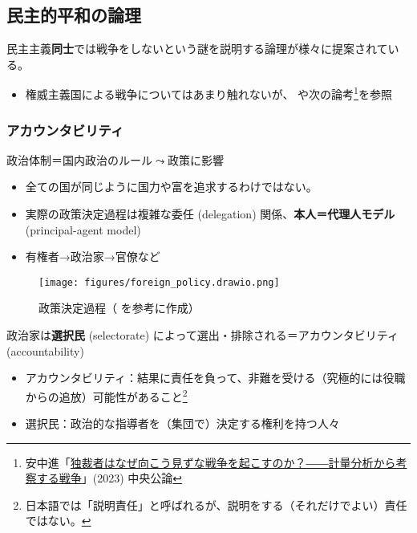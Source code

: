 \documentclass[
  xelatex,
  ja=standard]{bxjsarticle}
\providecommand{\tightlist}{%
  \setlength{\itemsep}{0pt}\setlength{\parskip}{0pt}}\usepackage{longtable,booktabs,array}
\begin{document}
\hypertarget{ux6c11ux4e3bux7684ux5e73ux548cux306eux8ad6ux7406}{%
\subsection{民主的平和の論理}\label{ux6c11ux4e3bux7684ux5e73ux548cux306eux8ad6ux7406}}

民主主義\textbf{同士}では戦争をしないという謎を説明する論理が様々に提案されている。

\begin{itemize}
\tightlist
\item
  権威主義国による戦争についてはあまり触れないが、 \citet{weeks2012}
  や次の論考\footnote{安中進「\href{https://chuokoron.jp/international/122696.html}{独裁者はなぜ向こう見ずな戦争を起こすのか？――計量分析から考察する戦争}」(2023)
    中央公論}を参照
\end{itemize}

\hypertarget{ux30a2ux30abux30a6ux30f3ux30bfux30d3ux30eaux30c6ux30a3}{%
\subsubsection{アカウンタビリティ}\label{ux30a2ux30abux30a6ux30f3ux30bfux30d3ux30eaux30c6ux30a3}}

政治体制＝国内政治のルール\(\leadsto\)政策に影響

\begin{itemize}
\tightlist
\item
  全ての国が同じように国力や富を追求するわけではない。
\item
  実際の政策決定過程は複雑な委任 (delegation)
  関係、\textbf{本人＝代理人モデル} (principal-agent model)
\item
  有権者→政治家→官僚など
\end{itemize}

\begin{figure}[htpb]

{\centering \texttt{[image: figures/foreign\_policy.drawio.png]}

}

\caption{政策決定過程（ \citet{yamakage2012} を参考に作成）}

\end{figure}

政治家は\textbf{選択民} (selectorate)
によって選出・排除される＝アカウンタビリティ (accountability)

\begin{itemize}
\tightlist
\item
  アカウンタビリティ：結果に責任を負って、非難を受ける（究極的には役職からの追放）可能性があること\footnote{日本語では「説明責任」と呼ばれるが、説明をする（それだけでよい）責任ではない。}
\item
  選択民：政治的な指導者を（集団で）決定する権利を持つ人々
\end{itemize}
\end{document}
